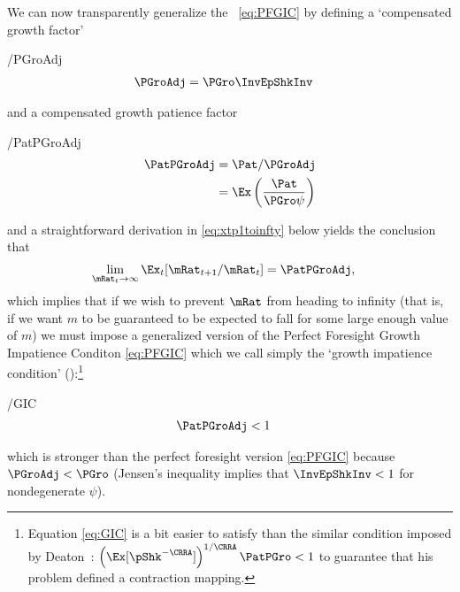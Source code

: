 \documentclass[./BufferStockTheory.tex]{subfiles}
\begin{document}
\hypertarget{GIC}{}
We can now transparently generalize the \PFGIC~\eqref{eq:PFGIC} by defining a `compensated growth factor' \hypertarget{PGroAdj}{}
\begin{verbatimwrite}{\EqDir/PGroAdj}
\begin{equation}\begin{gathered}\begin{aligned}
  \PGroAdj  & =  \PGro \InvEpShkInv \label{eq:PGroAdj}
\end{aligned}\end{gathered}\end{equation}
\end{verbatimwrite}

and a compensated growth patience factor\hypertarget{GIF}{}
\begin{verbatimwrite}{\EqDir/PatPGroAdj}
\begin{equation}\begin{gathered}\begin{aligned}
  \PatPGroAdj  & = \Pat/\PGroAdj
  \\ & = \Ex\left(\frac{\Pat}{\PGro \psi}\right)
\end{aligned}\end{gathered}\end{equation}
\end{verbatimwrite}

and a straightforward derivation in \eqref{eq:xtp1toinfty} below yields the conclusion that
\begin{align*}
  \lim_{\mRat_{t} \rightarrow \infty} \Ex_{t}[\mRat_{t+1}/\mRat_{t}]  & = \PatPGroAdj,
\end{align*}
which implies that if we wish to prevent $\mRat$ from heading to infinity (that is, if we want $m$ to be guaranteed to be expected to fall for some large enough value of $m$) we must impose a generalized version of the Perfect Foresight Growth Impatience Conditon \eqref{eq:PFGIC} which we call simply the `growth impatience condition' 
(\GIC):\footnote{Equation \eqref{eq:GIC} is a bit easier to satisfy than the similar condition imposed by Deaton~\citeyearpar{deatonLiqConstr}: $\left(\Ex[\pShk^{-\CRRA}]\right)^{1/\CRRA} \PatPGro < 1$ to guarantee that his problem defined a contraction mapping.}
\begin{verbatimwrite}{\EqDir/GIC}
\begin{equation}\begin{gathered}\begin{aligned}
  \PatPGroAdj  & < 1 \label{eq:GIC}
\end{aligned}\end{gathered}\end{equation}\end{verbatimwrite}

which is stronger than the perfect foresight version \eqref{eq:PFGIC} because $\PGroAdj < \PGro$ (Jensen's inequality implies that $\InvEpShkInv < 1$ for nondegenerate $\psi$).
\end{document}
